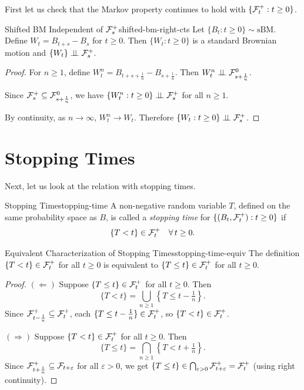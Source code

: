First let us check that the Markov property continues to hold with $\{\mathcal{F}_t^+ : t \geq 0\}$.

\begin{lemma}{Shifted BM Independent of $\mathcal{F}_s^+$}{shifted-bm-right-cts}
    Let $\{B_t : t \geq 0\} \sim \mathrm{sBM}$. Define $W_t = B_{t+s} - B_s$ for $t \geq 0$. Then $\{W_t : t \geq 0\}$ is a standard Brownian motion and $\{W_t\} \perp\!\!\!\perp \mathcal{F}_s^+$.
\end{lemma}

\begin{proof}
    For $n \geq 1$, define $W_t^n = B_{t+s+\frac{1}{n}} - B_{s+\frac{1}{n}}$. Then $W_t^n \perp\!\!\!\perp \mathcal{F}_{s+\frac{1}{n}}^0$.

    Since $\mathcal{F}_s^+ \subseteq \mathcal{F}_{s+\frac{1}{n}}^0$, we have $\{W_t^n : t \geq 0\} \perp\!\!\!\perp \mathcal{F}_s^+$ for all $n \geq 1$.

    By continuity, as $n \to \infty$, $W_t^n \to W_t$. Therefore $\{W_t : t \geq 0\} \perp\!\!\!\perp \mathcal{F}_s^+$.
\end{proof}

\section{Stopping Times}

Next, let us look at the relation with stopping times.

\begin{definition}{Stopping Time}{stopping-time}
    A non-negative random variable $T$, defined on the same probability space as $B$, is called a \emph{stopping time} for $\{(B_t, \mathcal{F}_t^+) : t \geq 0\}$ if
    \[
        \{T < t\} \in \mathcal{F}_t^+ \quad \forall\, t \geq 0.
    \]
\end{definition}

\begin{claim}{Equivalent Characterization of Stopping Times}{stopping-time-equiv}
    The definition $\{T < t\} \in \mathcal{F}_t^+$ for all $t \geq 0$ is equivalent to $\{T \leq t\} \in \mathcal{F}_t^+$ for all $t \geq 0$.
\end{claim}

\begin{proof}
    $(\Leftarrow)$\; Suppose $\{T \leq t\} \in \mathcal{F}_t^+$ for all $t \geq 0$. Then
    \[
        \{T < t\} = \bigcup_{n \geq 1} \left\{T \leq t - \tfrac{1}{n}\right\}.
    \]
    Since $\mathcal{F}_{t-\frac{1}{n}}^+ \subseteq \mathcal{F}_t^+$, each $\{T \leq t - \frac{1}{n}\} \in \mathcal{F}_t^+$, so $\{T < t\} \in \mathcal{F}_t^+$.

    \medskip
    $(\Rightarrow)$\; Suppose $\{T < t\} \in \mathcal{F}_t^+$ for all $t \geq 0$. Then
    \[
        \{T \leq t\} = \bigcap_{n \geq 1} \left\{T < t + \tfrac{1}{n}\right\}.
    \]
    Since $\mathcal{F}_{t+\frac{1}{n}}^+ \subseteq \mathcal{F}_{t+\varepsilon}$ for all $\varepsilon > 0$, we get $\{T \leq t\} \in \bigcap_{\varepsilon > 0} \mathcal{F}_{t+\varepsilon}^+ = \mathcal{F}_t^+$ (using right continuity).
\end{proof}

